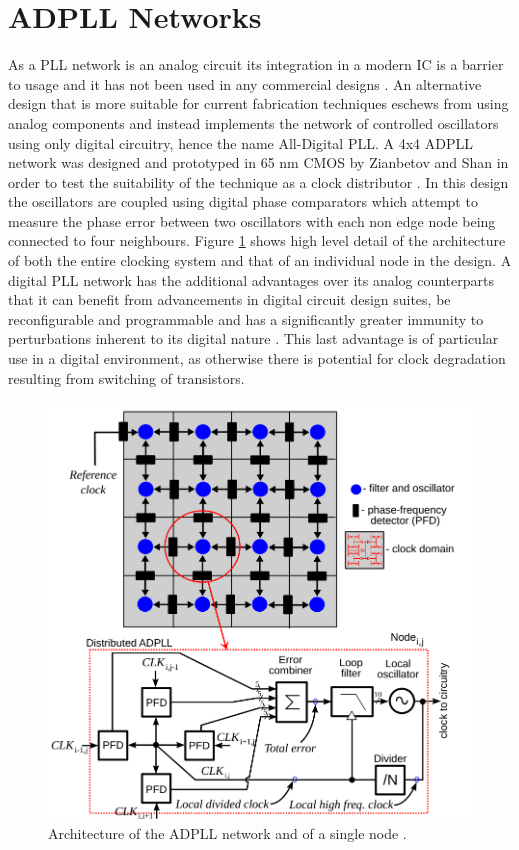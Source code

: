\documentclass[11pt,english,british]{report}
\begin{document}
\section{ADPLL Networks}
As a PLL network is an analog circuit its integration in a modern IC is a barrier to usage and it has not been used in any commercial designs \cite{zianbetov2013distributed}. An alternative design that is more suitable for current fabrication techniques eschews from using analog components and instead implements the network of controlled oscillators using only digital circuitry, hence the name All-Digital PLL. A 4x4 ADPLL network was designed and prototyped in 65 nm CMOS by Zianbetov and Shan in order to test the suitability of the technique as a clock distributor \cite{zianbetov2013phd,shan2014phd}. %
In this design the oscillators are coupled using digital phase comparators which attempt to measure the phase error between two oscillators with each non edge node being connected to four neighbours. Figure \ref{fig:eldar_node} shows high level detail of the architecture of both the entire clocking system and that of an individual node in the design. A digital PLL network has the additional advantages over its analog counterparts that it can benefit from advancements in digital circuit design suites, be reconfigurable and programmable and has a significantly greater immunity to perturbations inherent to its digital nature \cite{zianbetov2013phd}. This last advantage is of particular use in a digital environment, as otherwise there is potential for clock degradation resulting from switching of transistors.
\begin{figure}[h]
	\centering
	\includegraphics[scale=0.35]{../ccirc_2013_arch}
	\caption{Architecture of the ADPLL network and of a single node \cite{zianbetov2013distributed}.}
	\label{fig:eldar_node}
\end{figure}
\end{document}
